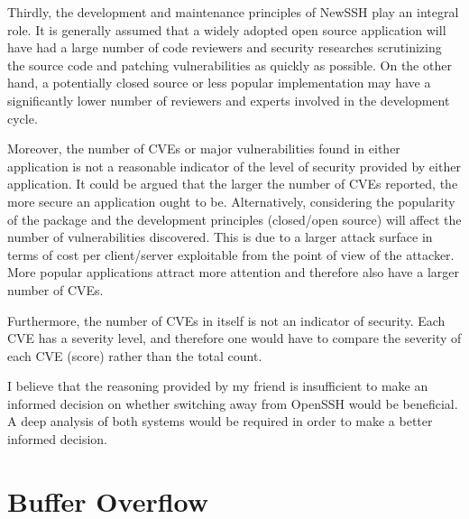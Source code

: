 \documentclass[a4paper, 12pt]{article}
\begin{document}
Thirdly, the development and maintenance principles of NewSSH play an integral role. It is generally assumed that a widely adopted open source application will have had a large number of code reviewers and security researches scrutinizing the source code and patching vulnerabilities as quickly as possible. On the other hand, a potentially closed source or less popular implementation may have a significantly lower number of reviewers and experts involved in the development cycle.

Moreover, the number of CVEs or major vulnerabilities found in either application is not a reasonable indicator of the level of security provided by either application. It could be argued that the larger the number of CVEs reported, the more secure an application ought to be. Alternatively, considering the popularity of the package and the development principles (closed/open source) will affect the number of vulnerabilities discovered. This is due to a larger attack surface in terms of cost per client/server exploitable from the point of view of the attacker. More popular applications attract more attention and therefore also have a larger number of CVEs.

Furthermore, the number of CVEs in itself is not an indicator of security. Each CVE has a severity level, and therefore one would have to compare the severity of each CVE (score) rather than the total count.

I believe that the reasoning provided by my friend is insufficient to make an informed decision on whether switching away from OpenSSH would be beneficial. A deep analysis of both systems would be required in order to make a better informed decision.

\newpage
\section*{Buffer Overflow}
\setcounter{section}{1}
\end{document}
